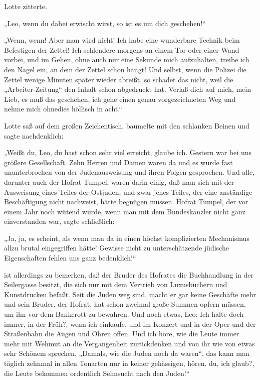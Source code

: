 Lotte zitterte.

„Leo, wenn du dabei erwischt wirst, so ist es um dich geschehen!“

„Wenn, wenn! Aber man wird nicht! Ich habe eine wunderbare Technik
beim Befestigen der Zettel! Ich schlendere morgens an einem Tor
oder einer Wand vorbei, und im Gehen, ohne auch nur eine Sekunde
mich aufzuhalten, treibe ich den Nagel ein, an dem der Zettel schon
hängt! Und selbst, wenn die Polizei die Zettel wenige Minuten
später wieder abreißt, so schadet das nicht, weil die
„Arbeiter-Zeitung“ den Inhalt schon abgedruckt hat. Verlaß dich auf
mich, mein Lieb, es muß das geschehen, ich gehe einen genau
vorgezeichneten Weg und nehme mich ohnedies höllisch in acht.“

Lotte saß auf dem großen Zeichentisch, baumelte mit
den schlanken Beinen und sagte nachdenklich:

„Weißt du, Leo, du hast schon sehr viel erreicht, glaube ich.
Gestern war bei uns größere Gesellschaft. Zehn Herren und Damen
waren da und es wurde fast ununterbrochen von der Judenausweisung
und ihren Folgen gesprochen. Und alle, darunter auch der Hofrat
Tumpel, waren darin einig, daß man sich mit der Ausweisung eines
Teiles der Ostjuden, und zwar jenes Teiles, der eine anständige
Beschäftigung nicht nachweist, hätte begnügen müssen. Hofrat
Tumpel, der vor einem Jahr noch wütend wurde, wenn man mit dem
Bundeskanzler nicht ganz einverstanden war, sagte schließlich:

„Ja, ja, es scheint, als wenn man da in einen höchst komplizierten
Mechanismus allzu brutal eingegriffen hätte! Gewisse nicht zu
unterschätzende jüdische Eigenschaften fehlen uns ganz
bedenklich!“

 ist allerdings zu bemerken, daß der Bruder
des Hofrates die Buchhandlung in der Seilergasse besitzt, die sich
nur mit dem Vertrieb von Luxusbüchern und Kunstdrucken befaßt. Seit
die Juden weg sind, macht er gar keine Geschäfte mehr und sein
Bruder, der Hofrat, hat schon zweimal große Summen opfern müssen,
um ihn vor dem Bankerott zu bewahren. Und noch etwas, Leo: Ich
halte doch immer, in der Früh?, wenn ich einkaufe, und im Konzert
und in der Oper und der Straßenbahn die Augen und Ohren offen. Und
ich höre, wie die Leute immer mehr mit Wehmut an die Vergangenheit
zurückdenken und von ihr wie von etwas sehr Schönem sprechen.
 „Damals, wie die Juden noch da waren“, das kann man
täglich zehnmal in allen Tonarten nur in keiner gehässigen, hören.
 du, ich glaub?, die Leute bekommen
ordentlich Sehnsucht nach den Juden!“

